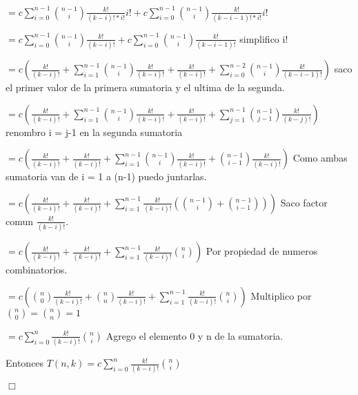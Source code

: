 $ = c \sum_{i=0}^{n-1} \binom{n-1}{i} \frac{k!}{(k-i)!*i!} i! + c \sum_{i=0}^{n-1} \binom{n-1}{i} \frac{k!}{(k-i-1)!*i!}i! $ 

$ = c \sum_{i=0}^{n-1} \binom{n-1}{i} \frac{k!}{(k-i)!} + c \sum_{i=0}^{n-1} \binom{n-1}{i} \frac{k!}{(k-i-1)!} $ simplifico i!

$ = c (\frac{k!}{(k-i)!} + \sum_{i=1}^{n-1} \binom{n-1}{i} \frac{k!}{(k-i)!} + \frac{k!}{(k-i)!} + \sum_{i=0}^{n-2} \binom{n-1}{i} \frac{k!}{(k-i-1)!} )$ saco el primer valor de la primera sumatoria y el ultima de la segunda.

$ = c (\frac{k!}{(k-i)!} + \sum_{i=1}^{n-1} \binom{n-1}{i} \frac{k!}{(k-i)!} + \frac{k!}{(k-i)!} + \sum_{j=1}^{n-1} \binom{n-1}{j-1} \frac{k!}{(k-j)!} )$ renombro i = j-1 en la segunda sumatoria

$ = c (\frac{k!}{(k-i)!} + \frac{k!}{(k-i)!} + \sum_{i=1}^{n-1} \binom{n-1}{i} \frac{k!}{(k-i)!} + \binom{n-1}{i-1} \frac{k!}{(k-i)!} )$ Como ambas sumatoria van de i = 1 a (n-1) puedo juntarlas.

$ = c (\frac{k!}{(k-i)!} + \frac{k!}{(k-i)!} + \sum_{i=1}^{n-1} \frac{k!}{(k-i)!} (\binom{n-1}{i} + \binom{n-1}{i-1} ))$ Saco factor comun $\frac{k!}{(k-i)!}$.

$ = c (\frac{k!}{(k-i)!} + \frac{k!}{(k-i)!} + \sum_{i=1}^{n-1} \frac{k!}{(k-i)!}\binom{n}{i})$ Por propiedad de numeros combinatorios.

$ = c (\binom{n}{0}\frac{k!}{(k-i)!} + \binom{n}{n}\frac{k!}{(k-i)!} + \sum_{i=1}^{n-1} \frac{k!}{(k-i)!}\binom{n}{i})$ Multiplico por $\binom{n}{0} = \binom{n}{n}= 1$

$ = c  \sum_{i=0}^{n} \frac{k!}{(k-i)!}\binom{n}{i}$ Agrego el elemento 0 y n de la sumatoria.

Entonces $T(n,k)  = c  \sum_{i=0}^{n} \frac{k!}{(k-i)!}\binom{n}{i}$ 

\begin{flushright}
    \hfill \ensuremath{\Box}
    \end{flushright}






% 
% 
% 
% 
% 
